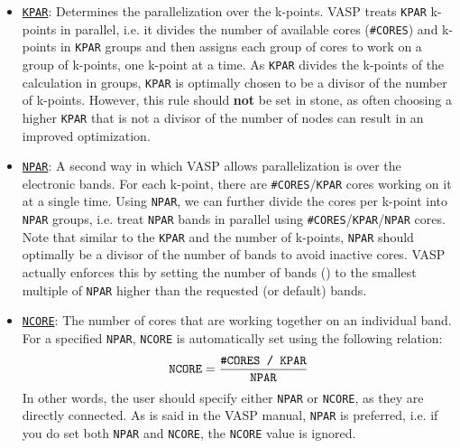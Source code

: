 \begin{refsection}
\begin{itemize} 

\item \href{https://cms.mpi.univie.ac.at/wiki/index.php/KPAR}{\texttt{KPAR}}: 
Determines the parallelization over the k-points. VASP treats 
\texttt{KPAR} k-points in parallel, i.e. it divides the number of available cores (\texttt{\#CORES}) and 
k-points in \texttt{KPAR} groups and then assigns each group of cores to work 
on a group of k-points, one k-point at a time. As \texttt{KPAR} divides the 
k-points of the calculation in groups, \texttt{KPAR} is optimally chosen to be 
a divisor of the number of k-points. However, this rule should \textbf{not} be 
set in stone, as often choosing a higher \texttt{KPAR} that is not a divisor 
of the number of nodes can result in an improved optimization. 
 
\item \href{https://cms.mpi.univie.ac.at/wiki/index.php/NPAR}{\texttt{NPAR}}: 
A second way in which VASP allows parallelization is over the 
electronic bands. For each k-point, there are \verb|#CORES|/\verb|KPAR| cores 
working on it at a single time. Using \verb|NPAR|, we can further divide the 
cores per k-point into \verb|NPAR| groups, i.e. treat \verb|NPAR| bands in 
parallel using \verb|#CORES|/\verb|KPAR|/\verb|NPAR| cores. Note that similar 
to the \verb|KPAR| and the number of k-points,  \verb|NPAR| should optimally 
be a divisor of the number of bands to avoid inactive cores. VASP 
actually enforces this by setting the number of bands () to the 
smallest multiple of \verb|NPAR| higher than the requested (or default) bands. 
 
\item 
\href{https://cms.mpi.univie.ac.at/wiki/index.php/NCORE}{\texttt{NCORE}}: The 
number of cores that are working together on an individual band. For a 
specified \verb|NPAR|, \verb|NCORE| is automatically set using the following 
relation: 
\begin{equation*} 
\texttt{NCORE} = \frac{\texttt{\#CORES / \texttt{KPAR}}}{\texttt{NPAR}} 
\end{equation*} 
In other words, the user should specify either \verb|NPAR| or \verb|NCORE|, as 
they are directly connected. As is said in the VASP manual, 
\verb|NPAR| is preferred, i.e. if you do set both \verb|NPAR| and 
\verb|NCORE|, the \verb|NCORE| value is ignored. 
 
 

\end{itemize}
\end{refsection}
